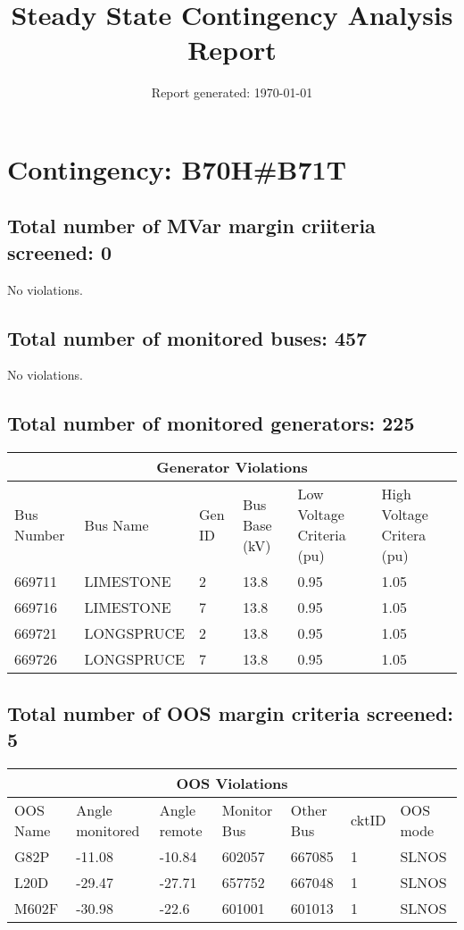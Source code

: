 \documentclass{article}%
\title{Steady State Contingency Analysis Report\vspace{-3ex}}%
\date{Report generated: \today\vspace{-2ex}}%
\begin{document}
%
\normalsize%
\maketitle%
\section*{Contingency: B70H\#B71T}%
\label{sec:ContingencyB70HB71T}%
\subsection*{Total number of MVar margin criiteria screened: 0}%
\label{subsec:TotalnumberofMVarmargincriiteriascreened0}%
No violations.

%
\subsection*{Total number of monitored buses: 457}%
\label{subsec:Totalnumberofmonitoredbuses457}%
No violations.

%
\subsection*{Total number of monitored generators: 225}%
\label{subsec:Totalnumberofmonitoredgenerators225}%
\begin{tabularx}{\textwidth}{|  X |p{4cm} | X | X | X | X |}%
\hline%
\multicolumn{6}{|c|}{Generator Violations}\\%
\hline%
Bus Number&Bus Name&Gen ID&Bus Base (kV)&Low Voltage Criteria (pu)&High Voltage Critera (pu)\\%
\hline%
669711&LIMESTONE&2&13.8&0.95&1.05\\%
\hline%
\hline%
669716&LIMESTONE&7&13.8&0.95&1.05\\%
\hline%
\hline%
669721&LONGSPRUCE&2&13.8&0.95&1.05\\%
\hline%
\hline%
669726&LONGSPRUCE&7&13.8&0.95&1.05\\%
\hline%
\end{tabularx}

%
\subsection*{Total number of OOS margin criteria screened: 5}%
\label{subsec:TotalnumberofOOSmargincriteriascreened5}%
\begin{tabularx}{\textwidth}{|  X |p{1.5cm} | X | X | X | X | X |}%
\hline%
\multicolumn{7}{|c|}{OOS Violations}\\%
\hline%
OOS Name&Angle monitored&Angle remote&Monitor Bus&Other Bus&cktID&OOS mode\\%
\hline%
G82P&{-}11.08&{-}10.84&602057&667085&1&SLNOS\\%
\hline%
\hline%
L20D&{-}29.47&{-}27.71&657752&667048&1&SLNOS\\%
\hline%
\hline%
M602F&{-}30.98&{-}22.6&601001&601013&1&SLNOS\\%
\hline%
\end{tabularx}
\end{document}
